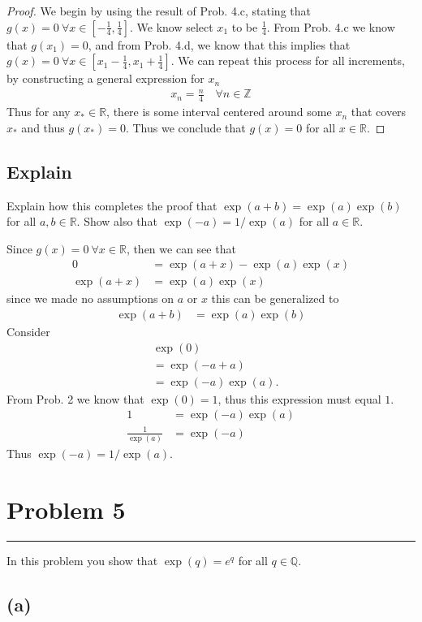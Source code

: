 \documentclass[12pt]{amsart}
\newcommand{\usec}[1]{%
  \section*{#1}%
  \noindent\rule{\textwidth}{2pt}%
  \vspace{10pt}%
}
\newcommand{\prob}[1]{Prob. #1}
\newcommand{\R}{\mathbb{R}}
\newcommand{\Z}{\mathbb{Z}}
\newcommand{\Q}{\mathbb{Q}}
\begin{document}
\begin{proof}
  We begin by using the result of \prob{4.c}, stating that $g(x)=0\ \forall
  x\in\left[-\frac{1}{4},\frac{1}{4}\right]$. We know select $x_1$ to be
  $\frac{1}{4}$. From \prob{4.c} we know that $g(x_1)=0$, and from \prob{4.d},
  we know that this implies that $g(x)=0\ \forall
  x\in\left[x_1-\frac{1}{4},x_1+\frac{1}{4}\right]$. We can repeat this process
  for all increments, by constructing a general expression for $x_n$
  \begin{align*}
    x_n=\frac{n}{4}\quad\forall n\in\Z
  \end{align*}
  Thus for any $x_*\in\R$, there is some interval centered around some $x_n$
  that covers $x_*$ and thus $g(x_*)=0$. Thus we conclude that $g(x)=0$ for all
  $x\in\R$.
\end{proof}

\subsection*{Explain}%
\label{sub:explain}

Explain how this completes the proof that $\exp(a+b)=\exp(a)\exp(b)$ for all
$a,b\in\R$. Show also that $\exp(-a)=1/\exp(a)$ for all $a\in\R$.

Since $g(x)=0\ \forall x\in\R$, then we can see that
\begin{align*}
  0&=\exp(a+x)-\exp(a)\exp(x)\\
  \exp(a+x)&=\exp(a)\exp(x)
\end{align*}
since we made no assumptions on $a$ or $x$ this can be generalized to
\begin{align*}
  \exp(a+b)&=\exp(a)\exp(b)
\end{align*}
Consider
\begin{align*}
  &\exp(0)\\
  &=\exp(-a+a)\\
  &=\exp(-a)\exp(a).
\end{align*}
From \prob{2} we know that $\exp(0)=1$, thus this expression must equal $1$.
\begin{align*}
  1&=\exp(-a)\exp(a)\\
  \frac{1}{\exp(a)}&=\exp(-a)
\end{align*}
Thus $\exp(-a)=1/\exp(a)$.

\usec{Problem 5}%
\label{sec:problem_5}

In this problem you show that $\exp(q)=e^q$ for all $q\in\Q$.

\subsection*{(a)}%
\label{sub:_a_}
\end{document}

